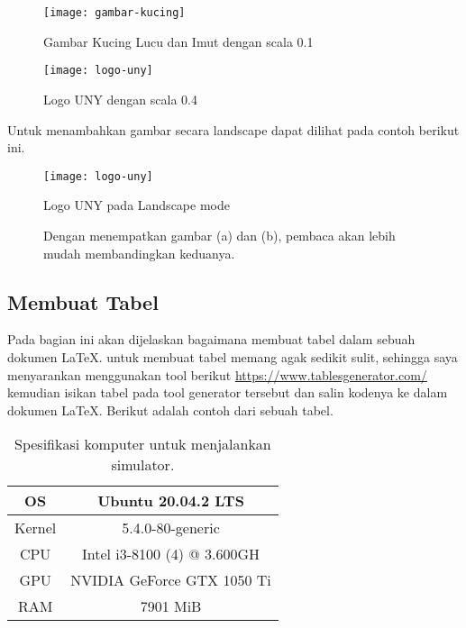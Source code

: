 \begin{figure}[H]
    \centering
    \texttt{[image: gambar-kucing]}
    \caption{Gambar Kucing Lucu dan Imut dengan scala 0.1}
\end{figure}

\begin{figure}[H]
    \centering
    \texttt{[image: logo-uny]}
    \caption{Logo UNY dengan scala 0.4}
\end{figure}

Untuk menambahkan gambar secara landscape dapat dilihat pada contoh berikut ini.

\begin{sidewaysfigure}[htbp]
	\centering
	\texttt{[image: logo-uny]}
	\caption{Logo UNY pada Landscape mode}
\end{sidewaysfigure}

\begin{figure}[H]
    \centering
    \hspace{0.1\linewidth}
    \caption{Dengan menempatkan gambar (a) dan (b), pembaca akan lebih mudah membandingkan keduanya.}
\end{figure}

\subsection{Membuat Tabel}
Pada bagian ini akan dijelaskan bagaimana membuat tabel dalam sebuah dokumen \LaTeX. untuk membuat tabel memang agak sedikit sulit, sehingga saya menyarankan menggunakan tool berikut \url{https://www.tablesgenerator.com/} kemudian isikan tabel pada tool generator tersebut dan salin kodenya ke dalam dokumen \LaTeX. Berikut adalah contoh dari sebuah tabel.

\begin{longtable}{|c|c|}
    \caption{Spesifikasi komputer untuk menjalankan simulator.}
    \label{tb:spesifikasikomputersimulator} \\
    \hline
    OS     & Ubuntu 20.04.2 LTS             \\
    \hline
    Kernel & 5.4.0-80-generic               \\
    \hline
    CPU    & Intel i3-8100 (4) @ 3.600GH    \\
    \hline
    GPU    & NVIDIA GeForce GTX 1050 Ti     \\
    \hline
    RAM    & 7901 MiB                       \\
    \hline
\end{longtable}


